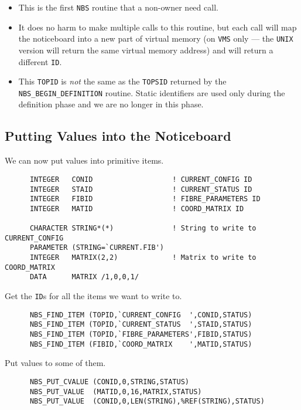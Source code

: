 \begin {itemize}
\item This is the first {\tt NBS} routine that a non-owner need call.
\item It does no harm to make multiple calls to this routine, but each call will
map the noticeboard into a new part of virtual memory (on {\tt VMS} only ---
the {\tt UNIX} version will return the same virtual memory address) and will 
return a different {\tt ID}.
\item This {\tt TOPID} is {\em not} the same as the {\tt TOPSID} returned by
the {\tt NBS\_BEGIN\_DEFINITION} routine. Static identifiers are used only
during the definition phase and we are no longer in this phase.
\end {itemize}

\subsection {Putting Values into the Noticeboard}

We can now put values into primitive items.

\begin {verbatim}
      INTEGER   CONID                   ! CURRENT_CONFIG ID
      INTEGER   STAID                   ! CURRENT_STATUS ID
      INTEGER   FIBID                   ! FIBRE_PARAMETERS ID
      INTEGER   MATID                   ! COORD_MATRIX ID

      CHARACTER STRING*(*)              ! String to write to CURRENT_CONFIG
      PARAMETER (STRING=`CURRENT.FIB')
      INTEGER   MATRIX(2,2)             ! Matrix to write to COORD_MATRIX
      DATA      MATRIX /1,0,0,1/
\end{verbatim}

Get the {\tt ID}s for all the items we want to write to.

\begin {verbatim}
      NBS_FIND_ITEM (TOPID,`CURRENT_CONFIG  ',CONID,STATUS)
      NBS_FIND_ITEM (TOPID,`CURRENT_STATUS  ',STAID,STATUS)
      NBS_FIND_ITEM (TOPID,`FIBRE_PARAMETERS',FIBID,STATUS)
      NBS_FIND_ITEM (FIBID,`COORD_MATRIX    ',MATID,STATUS)
\end{verbatim}

Put values to some of them.

\begin {verbatim}
      NBS_PUT_CVALUE (CONID,0,STRING,STATUS)
      NBS_PUT_VALUE  (MATID,0,16,MATRIX,STATUS)
      NBS_PUT_VALUE  (CONID,0,LEN(STRING),%
\end{verbatim}

